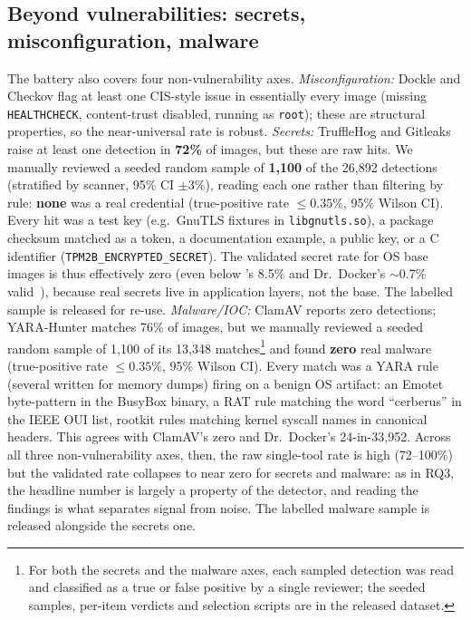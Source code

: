 \documentclass[12pt]{article}
\begin{document}
\subsection{Beyond vulnerabilities: secrets, misconfiguration, malware}
\label{sec:other}
The battery also covers four non-vulnerability axes.
\emph{Misconfiguration:}
Dockle and Checkov flag at least one CIS-style issue in essentially every image
(missing \texttt{HEALTHCHECK}, content-trust disabled, running as \texttt{root});
these are structural properties, so the near-universal rate is robust.
\emph{Secrets:} TruffleHog and Gitleaks raise at least one detection in
\textbf{72\%} of images, but these are raw hits. We manually reviewed a seeded
random sample of \textbf{1{,}100} of the 26{,}892 detections (stratified by
scanner, 95\% CI $\pm3\%$), reading each one rather than filtering by rule:
\textbf{none} was a real credential (true-positive rate $\le0.35\%$, 95\% Wilson
CI). Every hit was a test key (e.g.\ GnuTLS fixtures in \texttt{libgnutls.so}), a
package checksum matched as a token, a documentation example, a public key, or a
C identifier (\texttt{TPM2B\_ENCRYPTED\_SECRET}). The validated secret rate for OS
base images is thus effectively zero (even below \cite{dahlmanns2023secrets}'s
8.5\% and Dr.\ Docker's $\sim$0.7\% valid~\cite{shi2025drdocker}), because real
secrets live in application layers, not the base. The labelled sample is released
for re-use.
\emph{Malware/IOC:} ClamAV reports zero detections; YARA-Hunter matches 76\% of
images, but we manually reviewed a seeded random sample of 1{,}100 of its
13{,}348 matches\footnote{For both the secrets and the malware axes, each sampled
detection was read and classified as a true or false positive by a single
reviewer; the seeded samples, per-item verdicts and selection scripts are in the
released dataset.} and found \textbf{zero} real malware (true-positive rate
$\le0.35\%$, 95\% Wilson CI). Every match was a YARA rule (several written for
memory dumps) firing on a benign OS artifact: an Emotet byte-pattern in the
BusyBox binary, a RAT rule matching the word ``cerberus'' in the IEEE OUI list,
rootkit rules matching kernel syscall names in canonical headers. This agrees
with ClamAV's zero and Dr.\ Docker's 24-in-33{,}952. Across all three
non-vulnerability axes, then, the raw single-tool rate is high (72--100\%) but
the validated rate collapses to near zero for secrets and malware: as in RQ3,
the headline number is largely a property of the detector, and reading the
findings is what separates signal from noise. The labelled malware sample is
released alongside the secrets one.
\end{document}
